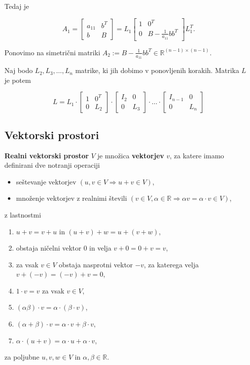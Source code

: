 \documentclass{article}
\begin{document}
\begin{multicols}{2}
	Tedaj je

	\[
		A_1 = \begin{bmatrix}
			a_{11} & b^T \\
			b      & B
		\end{bmatrix} = L_1 \begin{bmatrix}
			1 & 0^T                       \\
			0 & B - \frac{1}{a_{11}} bb^T
		\end{bmatrix} L_1^T.
	\]

	Ponovimo na simetrični matriki \( A_2 := B - \frac{1}{a_{11}} bb^T \in \mathbb{R}^{(n-1) \times (n-1)} \).

	Naj bodo \( L_2, L_3, \ldots, L_n \) matrike, ki jih dobimo v ponovljenih korakih. Matrika \( L \) je potem

	\[
		L = L_1 \cdot \left[ \begin{array}{cc}
				1 & 0^T \\
				0 & L_2
			\end{array} \right] \cdot \left[ \begin{array}{cc}
				I_2 & 0   \\
				0   & L_3
			\end{array} \right] \cdot \ldots \cdot \left[ \begin{array}{cc}
				I_{n-1} & 0   \\
				0       & L_n
			\end{array} \right]
	\]

	\subsection{Vektorski prostori}

	\textbf{Realni vektorski prostor} \( V \) je množica \textbf{vektorjev} \( v \), za katere imamo definirani dve notranji operaciji
	\begin{itemize}
		\item seštevanje vektorjev \( (u, v \in V \Rightarrow u+v \in V) \),
		\item množenje vektorjev z realnimi števili \( (v \in V, \alpha \in \mathbb{R} \Rightarrow \alpha v = \alpha \cdot v \in V) \),
	\end{itemize}
	z lastnostmi
	\begin{enumerate}
		\item \( u + v = v + u \) in \( (u + v) + w = u + (v + w) \),
		\item obstaja ničelni vektor \( 0 \) in velja \( v + 0 = 0 + v = v \),
		\item za vsak \( v \in V \) obstaja nasprotni vektor \( -v \), za katerega velja \( v + (-v) = (-v) + v = 0 \),
		\item \( 1 \cdot v = v \) za vsak \( v \in V \),
		\item \( (\alpha\beta) \cdot v = \alpha \cdot (\beta \cdot v) \),
		\item \( (\alpha + \beta) \cdot v = \alpha \cdot v + \beta \cdot v \),
		\item \( \alpha \cdot (u + v) = \alpha \cdot u + \alpha \cdot v \),
	\end{enumerate}
	za poljubne \( u, v, w \in V \) in \( \alpha, \beta \in \mathbb{R} \).



\end{multicols}
\end{document}

